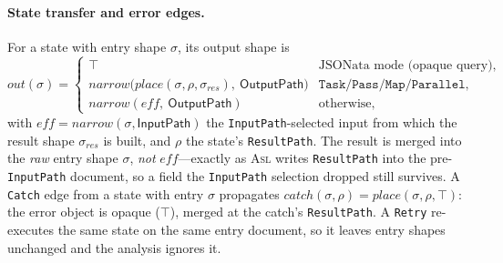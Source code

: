 \documentclass[11pt]{article}
\newcommand{\asl}{\textsc{Asl}}
\newcommand{\narrow}{\mathit{narrow}}
\newcommand{\place}{\mathit{place}}
\newcommand{\eff}{\mathit{eff}}
\theoremstyle{plain}
\theoremstyle{definition}
\theoremstyle{remark}
\begin{document}
\paragraph{State transfer and error edges.}
For a state with entry shape $\sigma$, its output shape is
\[
  \mathit{out}(\sigma)=
  \begin{cases}
    \top & \text{JSONata mode (opaque query),}\\
    \narrow\!\bigl(\place(\sigma,\rho,\sigma_{\mathit{res}}),\ \textsf{OutputPath}\bigr)
      & \texttt{Task}/\texttt{Pass}/\texttt{Map}/\texttt{Parallel},\\
    \narrow(\eff,\ \textsf{OutputPath}) & \text{otherwise,}
  \end{cases}
\]
with $\eff=\narrow(\sigma,\textsf{InputPath})$ the \texttt{InputPath}-selected input from
which the result shape $\sigma_{\mathit{res}}$ is built, and $\rho$ the state's
\texttt{ResultPath}. The result is merged into the \emph{raw} entry shape $\sigma$, \emph{not}
$\eff$---exactly as \asl{} writes \texttt{ResultPath} into the pre-\texttt{InputPath}
document, so a field the \texttt{InputPath} selection dropped still survives. A \texttt{Catch}
edge from a state with entry $\sigma$ propagates
$\mathit{catch}(\sigma,\rho)=\place(\sigma,\rho,\top)$: the error object is opaque ($\top$),
merged at the catch's \texttt{ResultPath}. A \texttt{Retry} re-executes the same state on the
same entry document, so it leaves entry shapes unchanged and the analysis ignores it.
\end{document}

